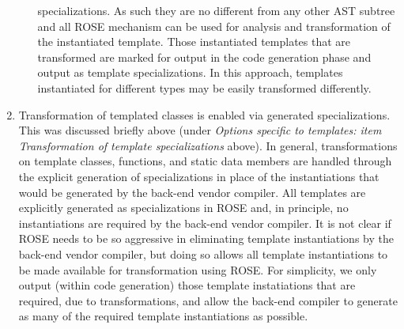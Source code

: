\begin{enumerate}
\begin{itemize}
                     specializations. As such they are no different from any other AST
                     subtree and all ROSE mechanism can be used for analysis and
                     transformation of the instantiated template.  Those instantiated 
                     templates that are transformed are marked for output in the 
                     code generation phase and output as template specializations.
                     In this approach, templates instantiated for different types
                     may be easily transformed differently.
          \end{itemize}

     \item Transformation of templated classes is enabled via generated specializations. \\
           This was discussed briefly above (under {\em Options specific to templates:
           item Transformation of template specializations} above).  In general,
           transformations on template classes, functions, and static data members are
           handled through the explicit generation of specializations in place of the 
           instantiations that would be generated by the back-end vendor compiler.  All 
           templates are explicitly generated as specializations in ROSE and, in principle, 
           no instantiations are required by the back-end vendor compiler.  It is not clear
           if ROSE needs to be so aggressive in eliminating template instantiations by the
           back-end vendor compiler, but doing so allows all template instantiations to be
           made available for transformation using ROSE.  For simplicity, we only output
           (within code generation) those template instatiations that are required, due 
           to transformations, and 
           allow the back-end compiler to generate as many of the required template 
           instantiations as possible.


\end{enumerate}
